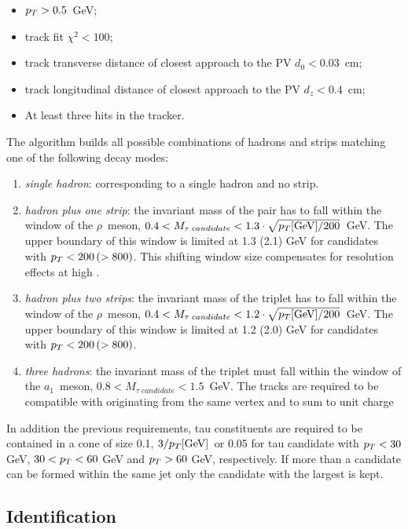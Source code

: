 \begin{itemize}
\item $p_{T} > 0.5$\ GeV;
\item track fit $\chi^2 < 100$;
\item track transverse distance of closest approach to the PV $d_0 < 0.03$\ cm;
\item track longitudinal distance of closest approach to the PV $d_z < 0.4$\ cm;
\item At least three hits in the tracker.
\end{itemize}

The algorithm builds all possible combinations of hadrons and strips matching one of the following decay modes:

\begin{enumerate}
\item \emph{single hadron}: corresponding to a single hadron and no strip.
\item \emph{hadron plus one strip}: the invariant mass of the pair has to fall within the window of the $\rho$\ meson, $0.4 < M_{\tau \; candidate} < 1.3 \cdot \sqrt{p_{T} \mathrm{[GeV]} / 200}$\ GeV. The upper boundary of this window is limited at 1.3 (2.1) GeV for candidates with $p_{T} < 200 \, (> 800)$. This shifting window size compensates for resolution effects at high \pT.
\item \emph{hadron plus two strips}: the invariant mass of the triplet has to fall within the window of the $\rho$\ meson, $0.4 < M_{\tau \; candidate} < 1.2 \cdot \sqrt{p_{T} \mathrm{[GeV]} / 200}$\ GeV. The upper boundary of this window is limited at 1.2 (2.0) GeV for candidates with $p_{T} < 200 \, (> 800)$.
\item \emph{three hadrons}: the invariant mass of the triplet must fall within the window of the $a_1$\ meson, $0.8 < M_{\tau \; candidate} < 1.5$\ GeV. The tracks are required to be compatible with originating from the same vertex and to sum to unit charge
\end{enumerate}

In addition the previous requirements, tau constituents are required to be contained in a cone of size 0.1, $3 / p_{T} \mathrm{[GeV]}$\ or 0.05 for tau candidate with $p_{T} < 30$ GeV, $30 < p_{T} < 60$ GeV and $p_{T} > 60$ GeV, respectively. If more than a candidate can be formed within the same jet only the candidate with the largest \pT is kept.

\subsection{Identification}

